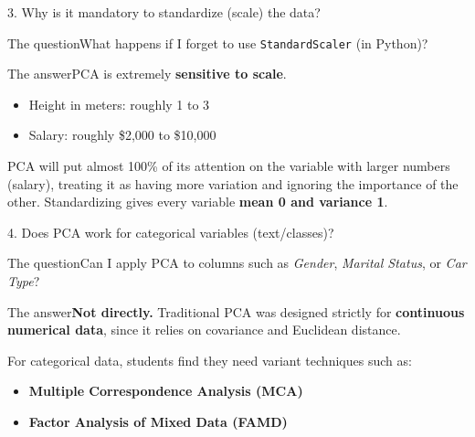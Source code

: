\documentclass[aspectratio=43,11pt]{beamer}
\newcommand{\question}[1]{\begin{alertblock}{The question}#1\end{alertblock}}
\newcommand{\answer}[1]{\begin{exampleblock}{The answer}#1\end{exampleblock}}
\begin{document}

\begin{frame}[fragile]{3. Why is it mandatory to standardize (scale) the data?}
\question{What happens if I forget to use \texttt{StandardScaler} (in Python)?}

\answer{PCA is extremely \textbf{sensitive to scale}.
\begin{itemize}
  \item Height in meters: roughly 1 to 3
  \item Salary: roughly \$2{,}000 to \$10{,}000
\end{itemize}
PCA will put almost 100\% of its attention on the variable with larger numbers
(salary), treating it as having more variation and ignoring the importance of
the other. Standardizing gives every variable \textbf{mean 0 and variance 1}.}
\end{frame}


\begin{frame}{4. Does PCA work for categorical variables (text/classes)?}
\question{Can I apply PCA to columns such as \emph{Gender},
\emph{Marital Status}, or \emph{Car Type}?}

\answer{\textbf{Not directly.} Traditional PCA was designed strictly for
\textbf{continuous numerical data}, since it relies on covariance and
Euclidean distance.

For categorical data, students find they need variant techniques such as:
\begin{itemize}
  \item \textbf{Multiple Correspondence Analysis (MCA)}
  \item \textbf{Factor Analysis of Mixed Data (FAMD)}
\end{itemize}}
\end{frame}

\end{document}

